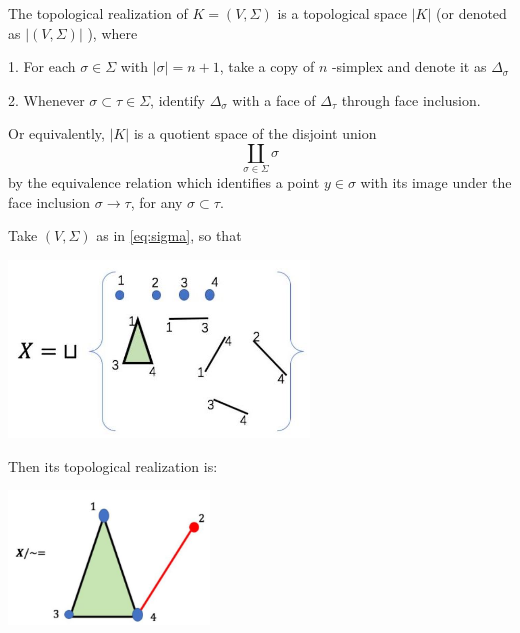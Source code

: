 \begin{definition} \label{def:topological_realization} The topological realization of \(K = \left( {V,\Sigma }\right)\) is a topological space \(\left| K\right|\) (or denoted as \(\left| \left( {V,\Sigma }\right) \right|\) ), where

1. For each \(\sigma  \in  \Sigma\) with \(\left| \sigma \right|  = n + 1\), take a copy of \(n\) -simplex and denote it as \({\Delta }_{\sigma }\)

2. Whenever \(\sigma  \subset  \tau  \in  \Sigma\), identify \({\Delta }_{\sigma }\) with a face of \({\Delta }_{\tau }\) through face inclusion.

Or equivalently, \(\left| K\right|\) is a quotient space of the disjoint union
\[
\mathop{\coprod }\limits_{{\sigma  \in  \Sigma }}\sigma
\]
by the equivalence relation which identifies a point \(y \in  \sigma\) with its image under the face inclusion \(\sigma  \rightarrow  \tau\), for any \(\sigma  \subset  \tau\).
\end{definition}

\begin{example} Take $(V,\Sigma)$ as in \autoref{eq:sigma}, so that
\begin{center}
\includegraphics[width=0.6\textwidth]{images/Ch4_glue1.jpg}
\end{center}
Then its topological realization is:
\begin{center}
\includegraphics[width=0.4\textwidth]{images/Ch4_glue2.jpg}
\end{center}
\end{example} 

